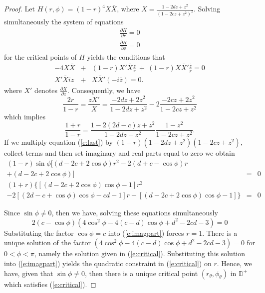 \documentclass[12pt]{icgft}
\newcommand{\D}{\mathbb D}
\newcommand{\ds}{\displaystyle}
\theoremstyle{definition}
\numberwithin{equation}{section}
\begin{document}
\begin{proof}
Let $H(r,\phi) = (1-r)^4 X{\bar X}$, where ${\ds X =\frac{1 - 2dz + z^2}{(1-2cz +z^2)^2} }$.
Solving simultaneously the system of equations
\begin{eqnarray*}
\frac{\partial H}{\partial r} = 0 \\
\frac{\partial H}{\partial \phi} = 0
\end{eqnarray*}
\noindent for the critical points of $H$ yields the conditions that
\begin{eqnarray*}
-4X{\bar X} &+& (1-r)X'{\bar X}\frac{z}{r} \ +\  (1-r)X{\bar X'}\frac{{\bar z}}{r} =0 \\
X'{\bar X}iz &+& X{\bar X'}(-i{\bar z}) = 0 .
\end{eqnarray*}
\noindent where $X'$ denotes ${\ds \frac{\partial X}{\partial z} }$.  Consequently, we have
\begin{equation*}
\frac{2r}{1-r} = \frac{zX'}{X} = \frac{-2 d z + 2z^2}{1-2dz+z^2}-2\frac{-2 c z + 2z^2}{1-2cz+z^2}
\end{equation*}
\noindent which implies
\begin{equation} \label{e:last}
\frac{1+r}{1-r} = \frac{1 - 2(2d-c)z + z^2}{1-2dz+z^2}\frac{1- z^2}{1-2cz+z^2} .
\end{equation}
If we multiply equation (\ref{e:last}) by $(1-r)(1-2dz+z^2)(1-2cz+z^2)$, collect terms and then set imaginary and real parts equal to zero we obtain
\begin{eqnarray}
(1-r)\sin \phi [(d-2c+2\cos \phi)r^2 -2(d+c-\cos \phi)r \label{e:imagpart} \\
  + (d-2c+2\cos \phi)] &=& 0 \nonumber \\
(1+r) \{[(d-2c+2\cos \phi)\cos \phi -1]r^2 \nonumber \\
 - 2[(2d - c + \cos \phi)\cos \phi -cd -1]r + [(d-2c+2\cos \phi)\cos \phi -1]\} &=& 0 \nonumber
\end{eqnarray}

Since $\sin \phi \ne 0$, then we have, solving these equations simultaneously
$$2(c - \cos \phi)(4 \cos^2 \phi -4(c-d) \cos \phi +d^2 -2cd -3) = 0$$
Substituting the factor $\cos \phi = c$ into (\ref{e:imagpart}) forces $r = 1$.  There is a unique solution of the factor $(4 \cos^2 \phi -4(c-d) \cos \phi +d^2 -2cd -3) = 0$ for $0< \phi < \pi$, namely
the solution given in (\ref{e:critical}).  Substituting this solution into (\ref{e:imagpart}) yields the quadratic constraint in (\ref{e:critical}) on $r$.    Hence, we have, given that $\sin \phi \ne 0$, then there is a unique critical point $(r_{\theta},\phi_{\theta})$ in $\D^+$ which satisfies (\ref{e:critical}).


\end{proof}
\end{document}
